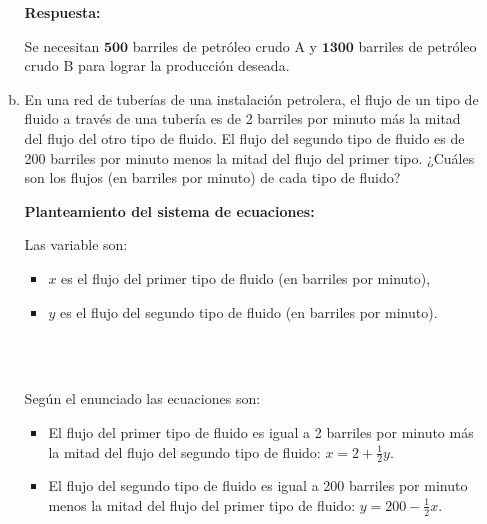 \documentclass[11pt]{article}
\begin{document}
\begin{enumerate}[\hspace{-7mm} 1) ]
\begin{enumerate}[a) ]
\vspace{40mm}





\textbf{Respuesta:}

Se necesitan $\mathbf{500}$ barriles de petróleo crudo A y $\mathbf{1300}$ barriles de petróleo crudo B para lograr la producción deseada.











\bigskip




\item En una red de tuberías de una instalación petrolera, el flujo de un tipo de fluido a través de una tubería es de 2 barriles por minuto más la mitad del flujo del otro tipo de fluido. El flujo del segundo tipo de fluido es de 200 barriles por minuto menos la mitad del flujo del primer tipo. ¿Cuáles son los flujos (en barriles por minuto) de cada tipo de fluido?



\textbf{Planteamiento del sistema de ecuaciones:}

\setlength{\columnsep}{9mm}
\begin{multicols}{2}
Las variable son:

\begin{itemize}
    \item $x$ es el flujo del primer tipo de fluido (en barriles por minuto),

    \item  $y$ es el flujo del segundo tipo de fluido (en barriles por minuto).
\end{itemize}
\, \\ 

\columnbreak %
\, \vspace{-13mm}

Según el enunciado las ecuaciones son:

\begin{itemize}
    \item El flujo del primer tipo de fluido es igual a 2 barriles por minuto más la mitad del flujo del segundo tipo de fluido:
   $ x = 2 + \tfrac{1}{2}y$.
    
    \item El flujo del segundo tipo de fluido es igual a 200 barriles por minuto menos la mitad del flujo del primer tipo de fluido:
    $y = 200 - \tfrac{1}{2}x$.
    

\end{itemize}
\end{multicols}
\end{enumerate}
\end{enumerate}
\end{document}
